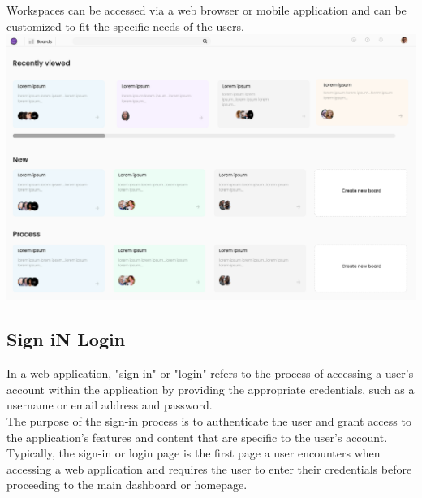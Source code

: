 Workspaces can be accessed via a web browser or mobile application and can be customized to fit the specific needs of the users.\\
\includegraphics[width=\columnwidth]{WA-workflix-HW1/images/Workspace.jpg}

\subsection{Sign iN Login}

In a web application, "sign in" or "login" refers to the process of accessing a user's account within the application by providing the appropriate credentials, such as a username or email address and password.\\

The purpose of the sign-in process is to authenticate the user and grant access to the application's features and content that are specific to the user's account.\\

Typically, the sign-in or login page is the first page a user encounters when accessing a web application and requires the user to enter their credentials before proceeding to the main dashboard or homepage.\\

